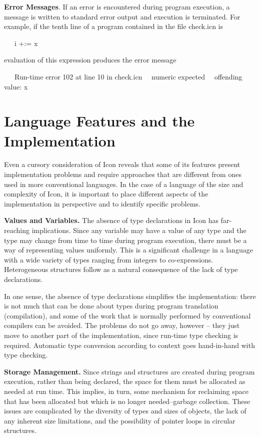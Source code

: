 \textbf{Error Messages}. If an error is encountered during program
execution, a message is written to standard error output and execution
is terminated. For example, if the tenth line of a program contained
in the file check.icn is

{\ttfamily\mdseries
\ \ \ i +:= {\textquotedbl}x{\textquotedbl}}

\noindent
evaluation of this expression produces the error message

{\ttfamily\mdseries
\ \ \ Run-time error 102 at line 10 in check.icn\newline
 \ \ numeric expected\newline
 \ \ offending value: {\textquotedbl}x{\textquotedbl}}


\section{Language Features and the Implementation}

Even a cursory consideration of Icon reveals that some of its features
present implementation problems and require approaches that are
different from ones used in more conventional languages. In the case
of a language of the size and complexity of Icon, it is important to
place different aspects of the implementation in perspective and to
identify specific problems.


\textbf{Values and Variables.} The absence of type declarations in
Icon has far-reaching implications. Since any variable may have a
value of any type and the type may change from time to time during
program execution, there must be a way of representing values
uniformly. This is a significant challenge in a language with a wide
variety of types ranging from integers to
co-expressions. Heterogeneous structures follow as a natural
consequence of the lack of type declarations.

In one sense, the absence of type declarations simplifies the
implementation: there is not much that can be done about types during
program translation (compilation), and some of the work that is
normally performed by conventional compilers can be avoided. The
problems do not go away, however -- they just move to another part of
the implementation, since run-time type checking is
required. Automatic type conversion according to context goes
hand-in-hand with type checking.


\textbf{Storage Management.} Since strings and structures are created
during program execution, rather than being declared, the space for
them must be allocated as needed at run time. This implies, in turn,
some mechanism for reclaiming space that has been allocated but which
is no longer needed--{\textquotedbl}garbage collection.{\textquotedbl}
These issues are complicated by the diversity of types and sizes of
objects, the lack of any inherent size limitations, and the
possibility of pointer loops in circular structures.


